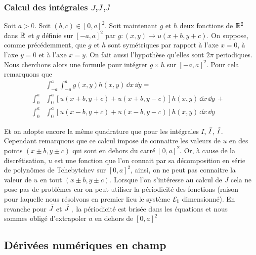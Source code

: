 \documentclass[10.5pt]{article}
\begin{document}
\begin{multicols}{2}
\vspace*{11pt}




\subsubsection{Calcul des intégrales $J$,$\bar{J}$,$\tilde{J}$ }

Soit $a>0$. Soit $(b,c) \in [0,a]^2$. Soit maintenant $g$ et $h$ deux fonctions de $\mathbb{R}^2$ dans $\mathbb{R}$ et  $g$ définie sur $[-a, a]^2$  par $g : (x,y) \rightarrow u(x+b, y+c)$. On suppose, comme précédemment, que $g$ et $h$ sont symétriques par rapport à l'axe $x=0$, à l'axe $y=0$ et à l'axe $x=y$. On fait aussi l'hypothèse qu'elles sont $2\pi$ periodiques. Nous cherchons alors une formule pour intégrer $g\times h$ sur $[-a, a]^2$. Pour cela remarquons que
\begin{equation}
\begin{split}
 & \int_{-a}^{a} \int_{-a}^{a} g(x,y) h(x,y) \,  \dd x \, \dd y  = \\
 \int_{0}^{a} & \int_{0}^{a} [u(x+b, y+c) + u(x+b, y-c)] h(x,y) \, \dd x \, \dd y \, + \\ 
\int_{0}^{a} & \int_{0}^{a} [u(x-b, y+c) + u(x-b, y-c)] h(x,y)  \, \dd x \, \dd y 
\end{split}
\end{equation}

Et on adopte encore la même quadrature que pour les intégrales $I$, $\bar{I}$, $\tilde{I}$. Cependant remarquons que ce calcul impose de connaitre les valeurs de $u$ en des points $(x \pm b, y\pm c)$ qui sont en dehors du carré $[0, a]^2$. Or, à cause de la discrétisation, $u$ est une fonction que l'on connait par sa décomposition en série de polynômes de Tchebytchev sur $[0,a]^2$, ainsi, on ne peut pas connaitre la valeur de $u$ en tout $(x\pm b, y\pm c)$. Lorsque l'on s'intéresse au calcul de $J$ cela ne pose pas de problèmes car on peut utiliser la périodicité des fonctions (raison pour laquelle nous résolvons en premier lieu le système $\mathcal{E}_1$ dimensionné). En revanche pour $\bar{J}$ et $\tilde{J}$ , la périodicité est brisée dans les équations et nous sommes obligé d'extrapoler $u$ en dehors de $[0,a]^2$





\subsection{Dérivées numériques en champ }


\end{multicols}
\end{document}
